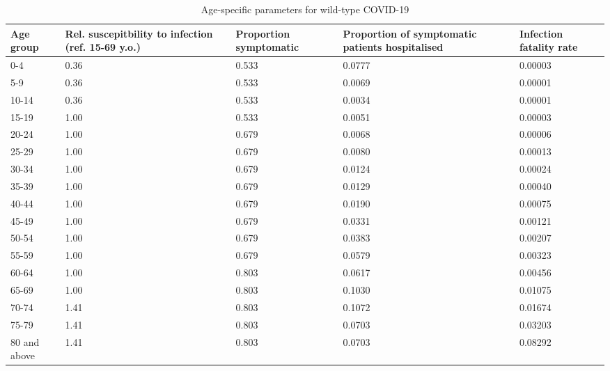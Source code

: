 \begin{table}
   \centering
\caption{Age-specific parameters for wild-type COVID-19}
\label{agespec_table}
\begin{tabular}{p{2cm} p{3cm} p{3cm} p{3cm} p{3cm}}
\toprule
   Age group & Rel. suscepitbility to infection (ref. 15-69 y.o.) \cite{zhang2020a} & Proportion symptomatic \cite{sah2021} & Proportion of symptomatic patients hospitalised \cite{rivm2020} & Infection fatality rate \cite{odriscoll2021} \\
\midrule
0-4 & 0.36 & 0.533 & 0.0777 & 0.00003 \\
5-9 & 0.36 & 0.533 & 0.0069 & 0.00001 \\
10-14 & 0.36 & 0.533 & 0.0034 & 0.00001 \\
15-19 & 1.00 & 0.533 & 0.0051 & 0.00003 \\
20-24 & 1.00 & 0.679 & 0.0068 & 0.00006 \\
25-29 & 1.00 & 0.679 & 0.0080 & 0.00013 \\
30-34 & 1.00 & 0.679 & 0.0124 & 0.00024 \\
35-39 & 1.00 & 0.679 & 0.0129 & 0.00040 \\
40-44 & 1.00 & 0.679 & 0.0190 & 0.00075 \\
45-49 & 1.00 & 0.679 & 0.0331 & 0.00121 \\
50-54 & 1.00 & 0.679 & 0.0383 & 0.00207 \\
55-59 & 1.00 & 0.679 & 0.0579 & 0.00323 \\
60-64 & 1.00 & 0.803 & 0.0617 & 0.00456 \\
65-69 & 1.00 & 0.803 & 0.1030 & 0.01075 \\
70-74 & 1.41 & 0.803 & 0.1072 & 0.01674 \\
75-79 & 1.41 & 0.803 & 0.0703 & 0.03203 \\
80 and above & 1.41 & 0.803 & 0.0703 & 0.08292 \\
\bottomrule
\end{tabular}
\end{table}

